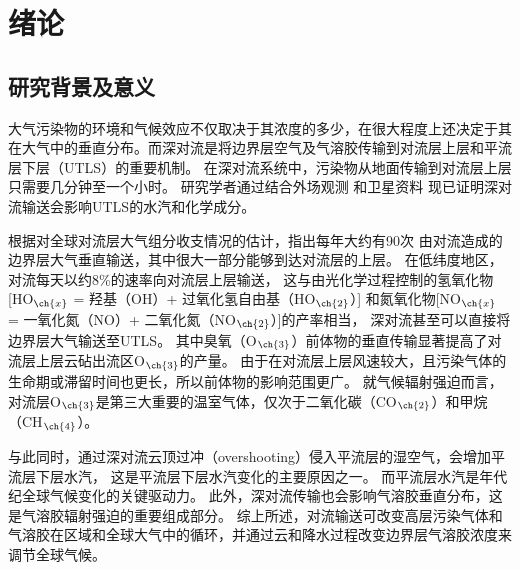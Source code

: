 
\chapter{绪论}

\section{研究背景及意义}

大气污染物的环境和气候效应不仅取决于其浓度的多少，在很大程度上还决定于其在大气中的垂直分布。而深对流是将边界层空气及气溶胶传输到对流层上层和平流层下层（UTLS）的重要机制\citep{Chatfield.1984,Dickerson.1987,Pickering.1989,Yin.2002}。
在深对流系统中，污染物从地面传输到对流层上层只需要几分钟至一个小时\citep{Skamarock.2000}。
研究学者通过结合外场观测\citep{Dickerson.1987,Pickering.1996,Bertram.2007,Apel.2012,Pan.2017}
和卫星资料\citep{Halland.2009,Barth.2012,Livesey.2013,Jensen.2015}
现已证明深对流输送会影响UTLS的水汽和化学成分。

根据对全球对流层大气组分收支情况的估计，\citet{Cotton.1995}指出每年大约有90次
由对流造成的边界层大气垂直输送，其中很大一部分能够到达对流层的上层。
在低纬度地区，对流每天以约8\%的速率向对流层上层输送，
这与由光化学过程控制的氢氧化物[HO$_{\ch{x}}$ = 羟基（OH）+ 过氧化氢自由基（HO$_{\ch{2}}$）]
和氮氧化物[NO$_{\ch{x}}$ = 一氧化氮（NO）+ 二氧化氮（NO$_{\ch{2}}$）]的产率相当，
深对流甚至可以直接将边界层大气输送至UTLS\citep{Prather.1997}。
其中臭氧（O$_{\ch{3}}$）前体物的垂直传输显著提高了对流层上层云砧出流区O$_{\ch{3}}$的产量\citep{Pickering.1990,Pickering.1992,Pickering.1992a}。
由于在对流层上层风速较大，且污染气体的生命期或滞留时间也更长，所以前体物的影响范围更广。
就气候辐射强迫而言，对流层O$_{\ch{3}}$是第三大重要的温室气体\citep{Myhre.2013}，仅次于二氧化碳（CO$_{\ch{2}}$）和甲烷（CH$_{\ch{4}}$）。

与此同时，通过深对流云顶过冲（overshooting）侵入平流层的湿空气，会增加平流层下层水汽\citep{Homeyer.2014}，
这是平流层下层水汽变化的主要原因之一。
而平流层水汽是年代纪全球气候变化的关键驱动力\citep{Solomon.2010}。 此外，深对流传输也会影响气溶胶垂直分布，这是气溶胶辐射强迫的重要组成部分\citep{Mishra.2012,Park.2015}。
综上所述，对流输送可改变高层污染气体和气溶胶在区域和全球大气中的循环\citep{Clarisse.2011}，并通过云和降水过程改变边界层气溶胶浓度来调节全球气候\citep{Taylor.1997}。

